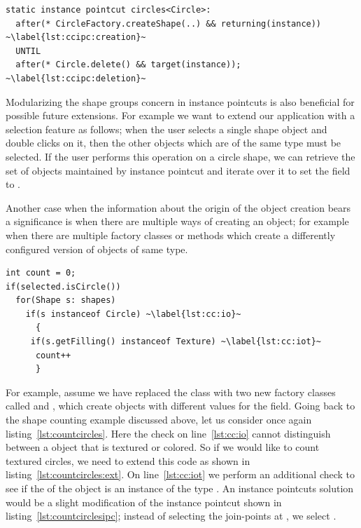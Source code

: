 \begin{lstlisting}[float, label={lst:countcirclesipc}, caption={An instance pointcut that keeps track of \lstinln{Circle} objects}]
static instance pointcut circles<Circle>: 
  after(* CircleFactory.createShape(..) && returning(instance)) ~\label{lst:ccipc:creation}~
  UNTIL
  after(* Circle.delete() && target(instance)); ~\label{lst:ccipc:deletion}~
\end{lstlisting}

Modularizing the shape groups concern in instance pointcuts is also beneficial for possible future extensions.
For example we want to extend our application with a selection feature as follows; when the user selects a single shape object and double clicks on it, then the other objects which are of the same type must be selected. 
If the user performs this operation on a circle shape, we can retrieve the set of objects maintained by  instance pointcut and iterate over it to set the field  to .

Another case when the information about the origin of the object creation bears a significance is when there are multiple ways of creating an object; for example when there are multiple factory classes or methods which create a differently configured version of objects of same type.  


\begin{lstlisting}[float, label={lst:countcircles}, caption={Extended code snippet for counting textured or colored \lstinln{Circle} objects}]
int count = 0;
if(selected.isCircle())
  for(Shape s: shapes)
    if(s instanceof Circle) ~\label{lst:cc:io}~
      {
	 if(s.getFilling() instanceof Texture) ~\label{lst:cc:iot}~
	  count++
      }
\end{lstlisting}

For example, assume we have replaced the  class with two new factory classes called  and , which create  objects with different values for the  field.
Going back to the shape counting example discussed above, let us consider once again listing~\ref{lst:countcircles}. 
Here the  check on line~\ref{lst:cc:io} cannot distinguish between a  object that is textured or colored.
So if we would like to count textured circles, we need to extend this code as shown in listing~\ref{lst:countcircles:ext}.
On line~\ref{lst:cc:iot} we perform an additional check to see if the  of the  object is an instance of the type .
An instance pointcuts solution would be a slight modification of the instance pointcut shown in listing~\ref{lst:countcirclesipc}; instead of selecting the join-points at , we select . 


